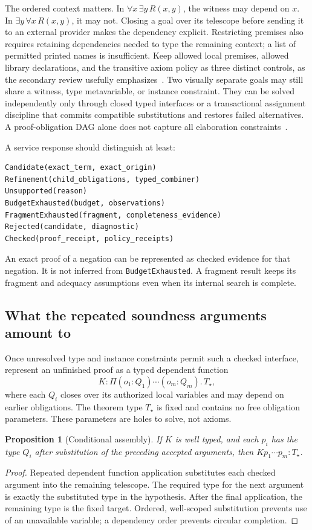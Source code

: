 \documentclass[11pt,letterpaper]{article}
\newcommand{\code}[1]{\nolinkurl{#1}}
\newtheorem{proposition}{Proposition}
\begin{document}
The ordered context matters. In \(\forall x\,\exists y\,R(x,y)\), the witness may
depend on \(x\). In \(\exists y\,\forall x\,R(x,y)\), it may not. Closing a goal
over its telescope before sending it to an external provider makes the dependency
explicit. Restricting premises also requires retaining dependencies needed to
type the remaining context; a list of permitted printed names is insufficient.
Keep allowed local premises, allowed library declarations, and the transitive
axiom policy as three distinct controls, as the secondary review usefully
emphasizes~\cite[\S5.1]{secondary}.
Two visually separate goals may still share a witness, type metavariable, or
instance constraint. They can be solved independently only through closed typed
interfaces or a transactional assignment discipline that commits compatible
substitutions and restores failed alternatives. A proof-obligation DAG alone
 does not capture all elaboration constraints~\cite[\S8.3]{loom}\cite[\S9.6]{contour}.

A service response should distinguish at least:
\begin{lstlisting}
Candidate(exact_term, exact_origin)
Refinement(child_obligations, typed_combiner)
Unsupported(reason)
BudgetExhausted(budget, observations)
FragmentExhausted(fragment, completeness_evidence)
Rejected(candidate, diagnostic)
Checked(proof_receipt, policy_receipts)
\end{lstlisting}
An exact proof of a negation can be represented as checked evidence for that
negation. It is not inferred from \code{BudgetExhausted}. A fragment result keeps
its fragment and adequacy assumptions even when its internal search is complete.

\subsection{What the repeated soundness arguments amount to}
Once unresolved type and instance constraints permit such a checked interface,
represent an unfinished proof as a typed dependent function
\[
 K : \Pi(o_1:Q_1)\cdots(o_m:Q_m).\,T_\star,
\]
where each \(Q_i\) closes over its authorized local variables and may depend on
earlier obligations. The theorem type \(T_\star\) is fixed and contains no free
obligation parameters. These parameters are holes to solve, not axioms.

\begin{proposition}[Conditional assembly]
If \(K\) is well typed, and each \(p_i\) has the type \(Q_i\) after substitution
of the preceding accepted arguments, then \(Kp_1\cdots p_m:T_\star\).
\end{proposition}
\begin{proof}
Repeated dependent function application substitutes each checked argument into
the remaining telescope. The required type for the next argument is exactly the
substituted type in the hypothesis. After the final application, the remaining
type is the fixed target. Ordered, well-scoped substitution prevents use of an
unavailable variable; a dependency order prevents circular completion.
\end{proof}
\end{document}
